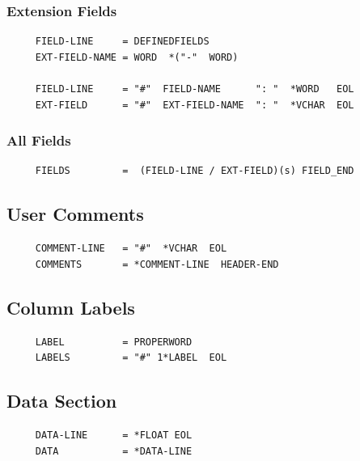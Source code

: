 \documentclass{article}
\begin{document}
\subsubsection{Extension Fields}
\label{apdx:gram_hdr_extension}
\begin{verbatim}
     FIELD-LINE     = DEFINEDFIELDS
     EXT-FIELD-NAME = WORD  *("-"  WORD)

     FIELD-LINE     = "#"  FIELD-NAME      ": "  *WORD   EOL
     EXT-FIELD      = "#"  EXT-FIELD-NAME  ": "  *VCHAR  EOL
\end{verbatim}

\subsubsection{All Fields}
\label{apdx:gram_fields}
\begin{verbatim}
     FIELDS         =  (FIELD-LINE / EXT-FIELD)(s) FIELD_END
\end{verbatim}


\subsection{User Comments}
\label{apdx:gram_comments}
\begin{verbatim}
     COMMENT-LINE   = "#"  *VCHAR  EOL
     COMMENTS       = *COMMENT-LINE  HEADER-END
\end{verbatim}

\subsection{Column Labels}
\label{apdx:gram_labels}
\begin{verbatim}
     LABEL          = PROPERWORD
     LABELS         = "#" 1*LABEL  EOL
\end{verbatim}

\subsection{Data Section}
\label{apdx:gram_data}
\begin{verbatim}
     DATA-LINE      = *FLOAT EOL
     DATA           = *DATA-LINE
\end{verbatim}
\end{document}
